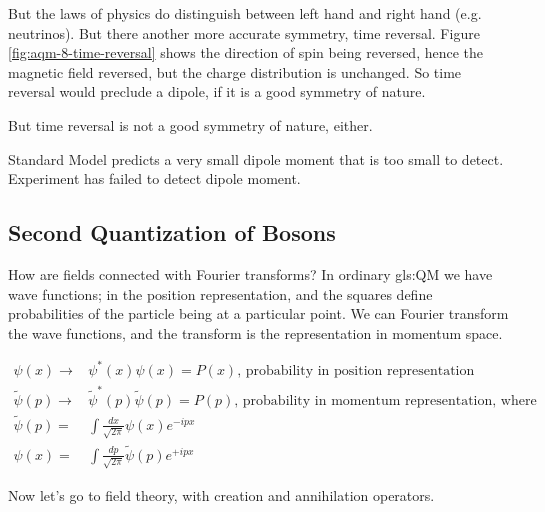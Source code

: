 \documentclass[]{article}
\begin{document}
But the laws of physics do distinguish between left hand and right hand (e.g. neutrinos). But there another more accurate symmetry, time reversal.  Figure \ref{fig:aqm-8-time-reversal} shows the direction of spin being reversed, hence the magnetic field reversed, but the charge distribution is unchanged. So time reversal would preclude a dipole, if it is a good symmetry of nature.

But time reversal is not a good symmetry of nature, either.

Standard Model predicts a very small dipole moment that is too small to detect. Experiment has failed to detect dipole moment.


\subsection{Second Quantization of Bosons}
 How are fields connected with Fourier transforms? In ordinary \gls{gls:QM} we have wave functions; in the position representation, and the squares define probabilities of the particle being at a particular point. We can Fourier transform the wave functions, and the transform is the representation in momentum space.

\begin{align*}
	\psi(x) \rightarrow& \psi^*(x)\psi(x)=P(x) \text{, probability in position representation}\\
	\widetilde{\psi}(p) \rightarrow& \widetilde{\psi}^*(p) \widetilde{\psi}(p) =P(p) \text{, probability in momentum representation, where}\\
	\widetilde{\psi}(p) =& \int \frac{dx}{\sqrt{2\pi}} \psi(x) e^{-i p x}\\
	\psi(x) =& \int \frac{dp}{\sqrt{2\pi}} \widetilde{\psi}(p) e^{+i p x}
\end{align*}

Now let's go to field theory, with creation and annihilation operators.
\end{document}
